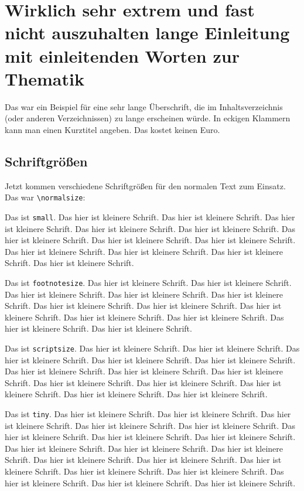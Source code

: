 \chapter[Nicht ganz so lange Einleitung]{Wirklich sehr extrem und fast nicht auszuhalten lange Einleitung mit einleitenden Worten zur Thematik}

Das war ein Beispiel für eine sehr lange Überschrift, die im Inhaltsverzeichnis (oder anderen Verzeichnissen) zu lange erscheinen würde. In eckigen Klammern kann man einen Kurztitel angeben. Das kostet keinen %
Euro.

\section{Schriftgrößen}
Jetzt kommen verschiedene Schriftgrößen für den normalen Text zum Einsatz. Das war \texttt{\textbackslash normalsize}:

{\small Das ist \texttt{small}. Das hier ist kleinere Schrift. Das hier ist kleinere Schrift. Das hier ist kleinere Schrift. Das hier ist kleinere Schrift. Das hier ist kleinere Schrift. Das hier ist kleinere Schrift. Das hier ist kleinere Schrift. Das hier ist kleinere Schrift. Das hier ist kleinere Schrift. Das hier ist kleinere Schrift. Das hier ist kleinere Schrift. Das hier ist kleinere Schrift.}

{\footnotesize Das ist \texttt{footnotesize}. Das hier ist kleinere Schrift. Das hier ist kleinere Schrift. Das hier ist kleinere Schrift. Das hier ist kleinere Schrift. Das hier ist kleinere Schrift. Das hier ist kleinere Schrift. Das hier ist kleinere Schrift. Das hier ist kleinere Schrift. Das hier ist kleinere Schrift. Das hier ist kleinere Schrift. Das hier ist kleinere Schrift. Das hier ist kleinere Schrift.}

{\scriptsize Das ist \texttt{scriptsize}. Das hier ist kleinere Schrift. Das hier ist kleinere Schrift. Das hier ist kleinere Schrift. Das hier ist kleinere Schrift. Das hier ist kleinere Schrift. Das hier ist kleinere Schrift. Das hier ist kleinere Schrift. Das hier ist kleinere Schrift. Das hier ist kleinere Schrift. Das hier ist kleinere Schrift. Das hier ist kleinere Schrift. Das hier ist kleinere Schrift. Das hier ist kleinere Schrift.}

{\tiny Das ist \texttt{tiny}. Das hier ist kleinere Schrift. Das hier ist kleinere Schrift. Das hier ist kleinere Schrift. Das hier ist kleinere Schrift. Das hier ist kleinere Schrift. Das hier ist kleinere Schrift. Das hier ist kleinere Schrift. Das hier ist kleinere Schrift. Das hier ist kleinere Schrift. Das hier ist kleinere Schrift. Das hier ist kleinere Schrift. Das hier ist kleinere Schrift. Das hier ist kleinere Schrift. Das hier ist kleinere Schrift. Das hier ist kleinere Schrift. Das hier ist kleinere Schrift. Das hier ist kleinere Schrift. Das hier ist kleinere Schrift. Das hier ist kleinere Schrift. }


